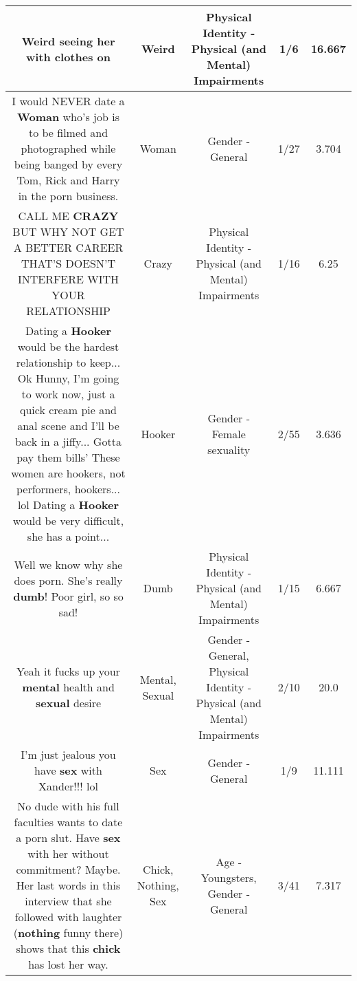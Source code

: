 \documentclass[11pt]{article}
\newlength\mylength
\begin{document}
\begin{center}
\begin{longtable}{|C{.65\mylength}|C{.30\mylength}|C{.12\mylength}|C{.12\mylength}|C{.12\mylength}|}
  \small Weird seeing her with clothes on\normalsize   & Weird & Physical Identity - Physical (and Mental) Impairments & 1/6 & 16.667 \\  \hline
  \small I would NEVER date a \textbf{Woman} who's job is to be filmed and photographed while being banged by every Tom, Rick and Harry in the porn business.\normalsize   & Woman & Gender - General & 1/27 & 3.704 \\  \hline
  \small CALL ME \textbf{CRAZY} BUT WHY NOT GET A BETTER CAREER THAT'S DOESN'T INTERFERE WITH YOUR RELATIONSHIP\normalsize   & Crazy & Physical Identity - Physical (and Mental) Impairments & 1/16 & 6.25 \\  \hline
  \small Dating a \textbf{Hooker} would be the hardest relationship to keep... Ok Hunny, I'm going to work now, just a quick cream pie and anal scene and I'll be back in a jiffy... Gotta pay them bills' These women are hookers, not performers, hookers... lol Dating a \textbf{Hooker} would be very difficult, she has a point...\normalsize   & Hooker & Gender - Female sexuality & 2/55 & 3.636 \\  \hline
  \small Well we know why she does porn. She's really \textbf{dumb}! Poor girl, so so sad!\normalsize   & Dumb & Physical Identity - Physical (and Mental) Impairments & 1/15 & 6.667 \\  \hline
  \small Yeah   it fucks up your \textbf{mental} health and \textbf{sexual} desire\normalsize   & Mental, Sexual & Gender - General, Physical Identity - Physical (and Mental) Impairments & 2/10 & 20.0 \\  \hline
  \small I'm just jealous you have \textbf{sex} with Xander!!! lol\normalsize   & Sex & Gender - General & 1/9 & 11.111 \\  \hline
  \small No dude  with his full faculties wants to date a porn slut.  Have \textbf{sex} with her without commitment? Maybe.  Her last words in this interview that she followed with laughter (\textbf{nothing} funny there) shows that this \textbf{chick} has lost her way.\normalsize   & Chick, Nothing, Sex & Age - Youngsters, Gender - General & 3/41 & 7.317 \\  \hline

\end{longtable}
\end{center}
\end{document}
